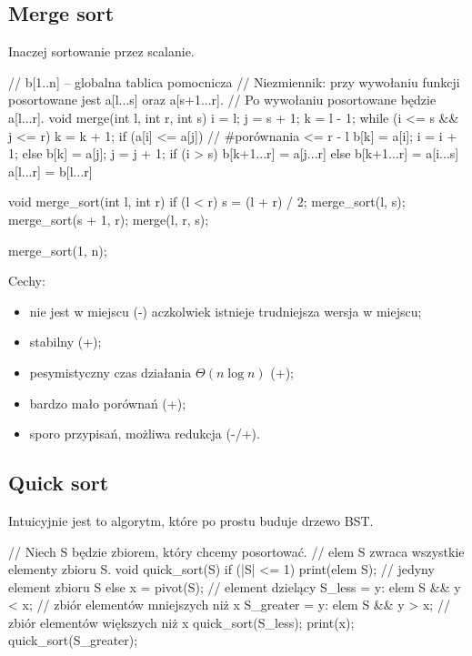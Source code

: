 \subsection{Merge sort}
Inaczej sortowanie przez scalanie.
\begin{cpp}
    // b[1..n] – globalna tablica pomocnicza
    // Niezmiennik: przy wywołaniu funkcji posortowane jest a[l...s] oraz a[s+1...r].
    // Po wywołaniu posortowane będzie a[l...r].
    void merge(int l, int r, int s) {
        i = l;
        j = s + 1;
        k = l - 1;
        while (i <= s && j <= r) {
            k = k + 1;
            if (a[i] <= a[j]) {     // #porównania <= r - l
                b[k] = a[i];
                i = i + 1;
            }
            else {
                b[k] = a[j];
                j = j + 1;
            }
        }
        if (i > s)
            b[k+1...r] = a[j...r]
        else
            b[k+1...r] = a[i...s]
        a[l...r] = b[l...r]
    }

    void merge_sort(int l, int r) {
        if (l < r) {
            s = (l + r) / 2;
            merge_sort(l, s);
            merge_sort(s + 1, r);
            merge(l, r, s);
        }
    }

    merge_sort(1, n);
\end{cpp}

Cechy:
\begin{itemize}
    \item nie jest w miejscu (-) aczkolwiek istnieje trudniejsza wersja w miejscu;
    \item stabilny (+);
    \item pesymistyczny czas działania $\Theta(n \log n)$ (+);
    \item bardzo mało porównań (+);
    \item sporo przypisań, możliwa redukcja (-/+).
\end{itemize}

\subsection{Quick sort}
Intuicyjnie jest to algorytm, które po prostu buduje drzewo BST.
\begin{cpp}
    // Niech S będzie zbiorem, który chcemy posortować.
    // elem S zwraca wszystkie elementy zbioru S.
    void quick_sort(S) {
        if (|S| <= 1) {
            print(elem S);                       // jedyny element zbioru S
        }
        else {
            x = pivot(S);                        // element dzielący
            S_less = {y: elem S && y < x};       // zbiór elementów mniejszych niż x
            S_greater = {y: elem S && y > x};    // zbiór elementów większych niż x
            quick_sort(S_less);
            print(x);
            quick_sort(S_greater);
        }
    }
\end{cpp}

